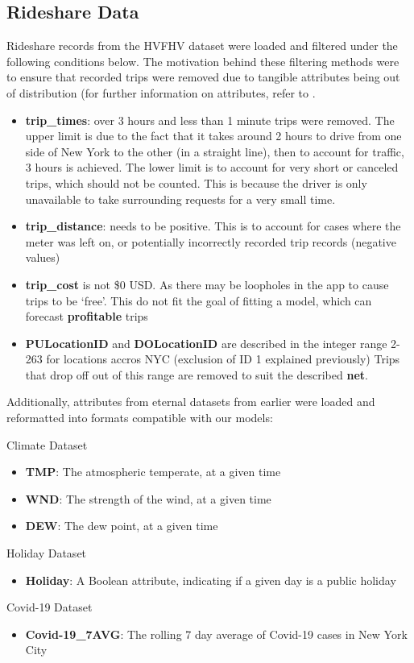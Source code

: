 \documentclass[11pt]{article}
\begin{document}
\subsection{Rideshare Data}
Rideshare records from the HVFHV dataset were loaded and filtered under the following conditions below. The motivation behind these filtering methods were to ensure that recorded trips were removed due to tangible attributes being out of distribution (for further information on attributes, refer to \cite{tlc}.
\begin{itemize}
    \item \textbf{trip\_times}: over 3 hours and less than 1 minute trips were removed. The upper limit is due to the fact that it takes around 2 hours to drive from one side of New York to the other (in a straight line), then to account for traffic, 3 hours is achieved. The lower limit is to account for very short or canceled trips, which should not be counted. This is because the driver is only unavailable to take surrounding requests for a very small time. 
    \item \textbf{trip\_distance}: needs to be positive. This is to account for cases where the meter was left on, or potentially incorrectly recorded trip records (negative values)
    \item \textbf{trip\_cost} is not \$0 USD. As there may be loopholes in the app to cause trips to be ‘free’. This do not fit the goal of fitting a model, which can forecast \textbf{profitable} trips
    \item \textbf{PULocationID} and \textbf{DOLocationID} are described in the integer range 2-263 for locations accros NYC (exclusion of ID 1 explained previously) Trips that drop off out of this range are removed to suit the described \textbf{net}.
\end{itemize}

Additionally, attributes from eternal datasets from earlier were loaded and reformatted into formats compatible with our models:


Climate Dataset
\begin{itemize}
    \item \textbf{TMP}: The atmospheric temperate, at a given time 
    \item \textbf{WND}: The strength of the wind, at a given time
    \item \textbf{DEW}: The dew point, at a given time
\end{itemize}
Holiday Dataset
\begin{itemize}
    \item \textbf{Holiday}: A Boolean attribute, indicating if a given day is a public holiday
\end{itemize}
Covid-19 Dataset
\begin{itemize}
    \item \textbf{Covid-19\_7AVG}: The rolling 7 day average of Covid-19 cases in New York City
\end{itemize}
\end{document}
